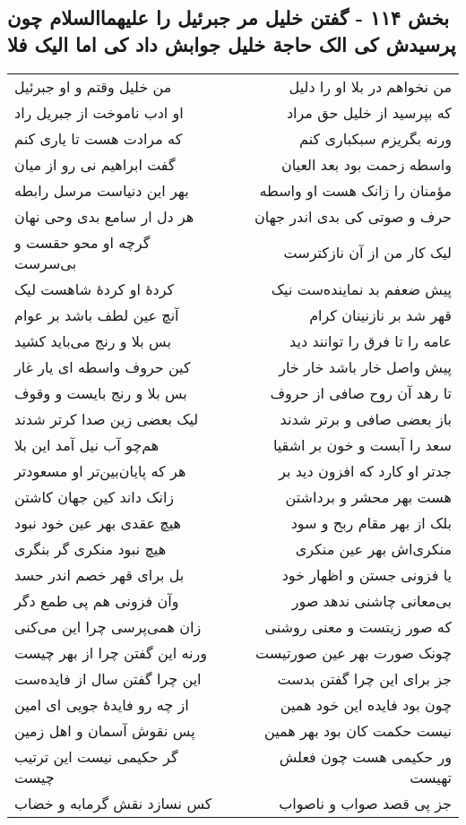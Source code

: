 \begin{center}
\section*{بخش ۱۱۴ - گفتن خلیل مر جبرئیل را علیهماالسلام  چون پرسیدش کی الک حاجة خلیل  جوابش داد کی اما الیک فلا}
\label{sec:sh114}
\begin{longtable}{l p{0.5cm} r}
من خلیل وقتم و او جبرئیل
&&
من نخواهم در بلا او را دلیل
\\
او ادب ناموخت از جبریل راد
&&
که بپرسید از خلیل حق مراد
\\
که مرادت هست تا یاری کنم
&&
ورنه بگریزم سبکباری کنم
\\
گفت ابراهیم نی رو از میان
&&
واسطه زحمت بود بعد العیان
\\
بهر این دنیاست مرسل رابطه
&&
مؤمنان را زانک هست او واسطه
\\
هر دل ار سامع بدی وحی نهان
&&
حرف و صوتی کی بدی اندر جهان
\\
گرچه او محو حقست و بی‌سرست
&&
لیک کار من از آن نازکترست
\\
کردهٔ او کردهٔ شاهست لیک
&&
پیش ضعفم بد نماینده‌ست نیک
\\
آنچ عین لطف باشد بر عوام
&&
قهر شد بر نازنینان کرام
\\
بس بلا و رنج می‌باید کشید
&&
عامه را تا فرق را توانند دید
\\
کین حروف واسطه ای یار غار
&&
پیش واصل خار باشد خار خار
\\
بس بلا و رنج بایست و وقوف
&&
تا رهد آن روح صافی از حروف
\\
لیک بعضی زین صدا کرتر شدند
&&
باز بعضی صافی و برتر شدند
\\
هم‌چو آب نیل آمد این بلا
&&
سعد را آبست و خون بر اشقیا
\\
هر که پایان‌بین‌تر او مسعودتر
&&
جدتر او کارد که افزون دید بر
\\
زانک داند کین جهان کاشتن
&&
هست بهر محشر و برداشتن
\\
هیچ عقدی بهر عین خود نبود
&&
بلک از بهر مقام ربح و سود
\\
هیچ نبود منکری گر بنگری
&&
منکری‌اش بهر عین منکری
\\
بل برای قهر خصم اندر حسد
&&
یا فزونی جستن و اظهار خود
\\
وآن فزونی هم پی طمع دگر
&&
بی‌معانی چاشنی ندهد صور
\\
زان همی‌پرسی چرا این می‌کنی
&&
که صور زیتست و معنی روشنی
\\
ورنه این گفتن چرا از بهر چیست
&&
چونک صورت بهر عین صورتیست
\\
این چرا گفتن سال از فایده‌ست
&&
جز برای این چرا گفتن بدست
\\
از چه رو فایدهٔ جویی ای امین
&&
چون بود فایده این خود همین
\\
پس نقوش آسمان و اهل زمین
&&
نیست حکمت کان بود بهر همین
\\
گر حکیمی نیست این ترتیب چیست
&&
ور حکیمی هست چون فعلش تهیست
\\
کس نسازد نقش گرمابه و خضاب
&&
جز پی قصد صواب و ناصواب
\\
\end{longtable}
\end{center}
